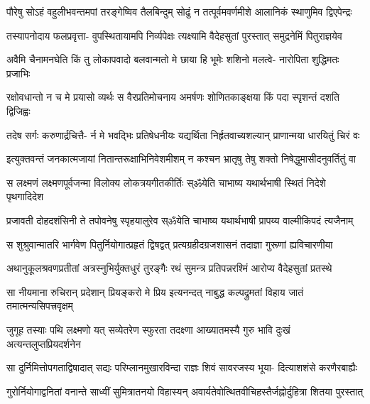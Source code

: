 \twolineshloka
{पौरेषु सोऽहं वहुलीभवन्तमपां तरङ्गेष्विव तैलबिन्दुम्}
{सोढुं न तत्पूर्वमवर्णमीशे आलानिकं स्थाणुमिव द्विएपेन्द्रः} %

\fourlineindentedshloka
{तस्यापनोदाय फलप्रवृत्ता-}
{वुपस्थितायामपि निर्व्यपेक्षः}
{त्यक्ष्यामि वैदेहसुतां पुरस्तात्}
{समुद्रनेमिं पितुराज्ञयेव} %

\fourlineindentedshloka
{अवैमि चैनामनघेति किं तु}
{लोकापवादो बलवान्मतो मे}
{छाया हि भूमेः शशिनो मलत्वे-}
{नारोपिता शुद्धिमतः प्रजाभिः} %

\fourlineindentedshloka
{रक्षोवधान्तो न च मे प्रयासो}
{व्यर्थः स वैरप्रतिमोचनाय}
{अमर्षणः शोणितकाङ्क्षया किं}
{पदा स्पृशन्तं दशति द्विजिह्वः} %

\fourlineindentedshloka
{तदेष सर्गः करुणार्द्रचित्तै-}
{र्न मे भवद्भिः प्रतिषेधनीयः}
{यद्यर्थिता निर्हृतवाच्यशल्यान्}
{प्राणान्मया धारयितुं चिरं वः} %

\fourlineindentedshloka
{इत्युक्तवन्तं जनकात्मजायां}
{नितान्तरूक्षाभिनिवेशमीशम्}
{न कश्चन भ्रातृषु तेषु शक्तो}
{निषेद्धुमासीदनुवर्तितुं वा} %

\fourlineindentedshloka
{स लक्ष्मणं लक्ष्मणपूर्वजन्मा}
{विलोक्य लोकत्रयगीतकीर्तिः}
{स्ॐयेति चाभाष्य यथार्थभाषी}
{स्थितं निदेशे पृथगादिदेश} %

\fourlineindentedshloka
{प्रजावती दोहदशंसिनी ते}
{तपोवनेषु स्पृहयालुरेव}
{स्ॐयेति चाभाष्य यथार्थभाषी}
{प्रापय्य वाल्मीकिपदं त्यजैनाम्} %

\twolineshloka
{स शुश्रुवान्मातरि भार्गवेण पितुर्नियोगात्प्रहृतं द्विषद्वत्}
{प्रत्यग्रहीदग्रजशासनं तदाज्ञा गुरूणां ह्यविचारणीया} %

\fourlineindentedshloka
{अथानुकूलश्रवणप्रतीतां}
{अत्रस्नुभिर्युक्तधुरं तुरङ्गैः}
{रथं सुमन्त्र प्रतिपन्नरश्मिं}
{आरोप्य वैदेहसुतां प्रतस्थे} %

\twolineshloka
{सा नीयमाना रुचिरान् प्रदेशान् प्रियङ्करो मे प्रिय इत्यनन्दत्}
{नाबुद्ध कल्पद्रुमतां विहाय जातं तमात्मन्यसिपत्त्रवृक्षम्} %

\fourlineindentedshloka
{जुगूह तस्याः पथि लक्ष्मणो यत्}
{सव्येतरेण स्फुरता तदक्ष्णा}
{आख्यातमस्यै गुरु भावि दुःखं}
{अत्यन्तलुप्तप्रियदर्शनेन} %

\fourlineindentedshloka
{सा दुर्निमित्तोपगताद्विषादात्}
{सद्यः परिम्लानमुखारविन्दा}
{राज्ञः शिवं सावरजस्य भूया-}
{दित्याशशंसे करणैरबाह्यैः} %

\twolineshloka
{गुरोर्नियोगाद्वनितां वनान्ते साध्वीं सुमित्रातनयो विहास्यन्}
{अवार्यतेवोत्थितवीचिहस्तैर्जह्नोर्दुहित्रा शितया पुरस्तात्} %

